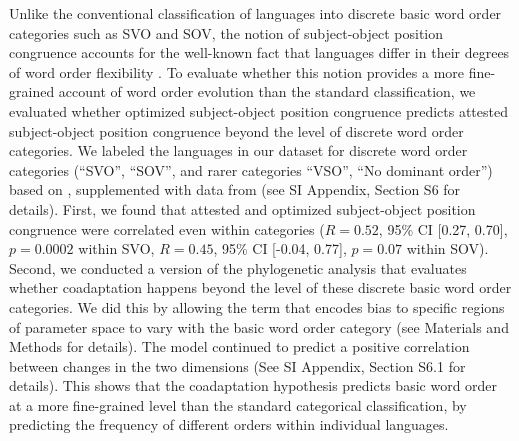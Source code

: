 \documentclass[9pt,twocolumn,twoside,lineno]{pnas-new}
\begin{document}
Unlike the conventional classification of languages into discrete basic word order categories such as SVO and SOV, the notion of subject-object position congruence accounts for the well-known fact that languages differ in their degrees of word order flexibility \citep{steele1978word}.
To evaluate whether this notion provides a more fine-grained account of word order evolution than the standard classification, we evaluated whether optimized subject-object position congruence predicts attested subject-object position congruence beyond the level of discrete word order categories.
We labeled the languages in our dataset for discrete word order categories (``SVO'', ``SOV'', and rarer categories ``VSO'', ``No dominant order'') based on \cite{wals-81}, supplemented with data from \cite{gell-mann-origin-2011} (see SI  Appendix, Section S6 for details).
First, we found that attested and optimized subject-object position congruence were correlated even within categories ($R = 0.52$, 95\% CI [0.27, 0.70], $p = 0.0002$ within SVO, $R=0.45$, 95\% CI [-0.04, 0.77], $p=0.07$ within SOV).  %
Second, we conducted a version of the phylogenetic analysis that evaluates whether coadaptation happens beyond the level of these discrete basic word order categories.
We did this by allowing the term that encodes bias to specific regions of parameter space to vary with the basic word order category  (see Materials and Methods for details).
The model continued to predict a positive correlation between changes in the two dimensions (See SI  Appendix, Section S6.1 for details). %
This shows that the coadaptation hypothesis predicts basic word order at a more fine-grained level than the standard categorical classification, by predicting the frequency of different orders within individual languages.
\end{document}
